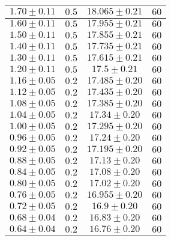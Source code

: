 \documentclass[../main.tex]{subfiles}
\begin{document}
\begin{tabular}{ ||c|c|c|c|| }
        \hline
        $1.70\pm 0.11$       & $0.5$       & $18.065\pm 0.21$  & $60$     \\
        \hline
        $1.60\pm 0.11$       & $0.5$       & $17.955\pm 0.21$  & $60$     \\
        \hline
        $1.50\pm 0.11$       & $0.5$       & $17.855\pm 0.21$ & $60$     \\
        \hline
        $1.40\pm 0.11$      & $0.5$       & $17.735\pm 0.21$  & $60$     \\
        \hline
        $1.30\pm 0.11$      & $0.5$       & $17.615\pm 0.21$  & $60$     \\
        \hline
        $1.20\pm 0.11$      & $0.5$       & $17.5\pm 0.21$    & $60$     \\
        \hline
        $1.16\pm 0.05$     & $0.2$       & $17.485\pm 0.20$  & $60$     \\
        \hline
        $1.12\pm 0.05$     & $0.2$       & $17.435\pm 0.20$  & $60$     \\
        \hline
        $1.08\pm0.05$     & $0.2$       & $17.385\pm 0.20$  & $60$     \\
        \hline
        $1.04\pm 0.05$     & $0.2$       & $17.34\pm 0.20$   & $60$     \\
        \hline
        $1.00\pm 0.05$        & $0.2$       & $17.295\pm 0.20$  & $60$     \\
        \hline
        $0.96\pm 0.05$     & $0.2$       & $17.24\pm 0.20$   & $60$     \\
        \hline
        $0.92\pm 0.05$     & $0.2$       & $17.195\pm 0.20$  & $60$     \\
        \hline
        $0.88\pm 0.05$     & $0.2$       & $17.13\pm 0.20$   & $60$     \\
        \hline
        $0.84\pm 0.05$     & $0.2$       & $17.08\pm 0.20$   & $60$     \\
        \hline
        $0.80\pm 0.05$      & $0.2$       & $17.02\pm 0.20$   & $60$     \\
        \hline
        $0.76\pm 0.05$     & $0.2$       & $16.955\pm 0.20$  & $60$     \\
        \hline
        $0.72\pm 0.05$     & $0.2$       & $16.9\pm 0.20$    & $60$     \\
        \hline
        $0.68\pm 0.04$     & $0.2$       & $16.83\pm 0.20$   & $60$     \\
        \hline
        $0.64\pm 0.04$     & $0.2$       & $16.76\pm 0.20$   & $60$     \\

\end{tabular}
\end{document}
